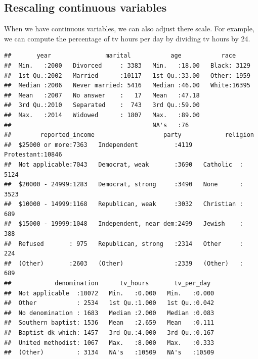 \documentclass[]{tufte-book}
\newenvironment{Shaded}{}{}
\newcommand{\DataTypeTok}[1]{\textcolor[rgb]{0.56,0.13,0.00}{#1}}
\newcommand{\DecValTok}[1]{\textcolor[rgb]{0.25,0.63,0.44}{#1}}
\newcommand{\KeywordTok}[1]{\textcolor[rgb]{0.00,0.44,0.13}{\textbf{#1}}}
\newcommand{\NormalTok}[1]{#1}
\newcommand{\OperatorTok}[1]{\textcolor[rgb]{0.40,0.40,0.40}{#1}}
\newcommand{\StringTok}[1]{\textcolor[rgb]{0.25,0.44,0.63}{#1}}
\begin{document}
\hypertarget{rescaling-continuous-variables}{%
\subsection{Rescaling continuous variables}\label{rescaling-continuous-variables}}

When we have continuous variables, we can also adjust there scale. For example, we can compute the percentage of tv hours per day by dividing tv hours by 24.

\begin{Shaded}
\end{Shaded}

\begin{verbatim}
##       year               marital           age           race      
##  Min.   :2000   Divorced     : 3383   Min.   :18.00   Black: 3129  
##  1st Qu.:2002   Married      :10117   1st Qu.:33.00   Other: 1959  
##  Median :2006   Never married: 5416   Median :46.00   White:16395  
##  Mean   :2007   No answer    :   17   Mean   :47.18                
##  3rd Qu.:2010   Separated    :  743   3rd Qu.:59.00                
##  Max.   :2014   Widowed      : 1807   Max.   :89.00                
##                                       NA's   :76                   
##        reported_income                   party            religion    
##  $25000 or more:7363   Independent          :4119   Protestant:10846  
##  Not applicable:7043   Democrat, weak       :3690   Catholic  : 5124  
##  $20000 - 24999:1283   Democrat, strong     :3490   None      : 3523  
##  $10000 - 14999:1168   Republican, weak     :3032   Christian :  689  
##  $15000 - 19999:1048   Independent, near dem:2499   Jewish    :  388  
##  Refused       : 975   Republican, strong   :2314   Other     :  224  
##  (Other)       :2603   (Other)              :2339   (Other)   :  689  
##            denomination      tv_hours       tv_per_day   
##  Not applicable  :10072   Min.   :0.000   Min.   :0.000  
##  Other           : 2534   1st Qu.:1.000   1st Qu.:0.042  
##  No denomination : 1683   Median :2.000   Median :0.083  
##  Southern baptist: 1536   Mean   :2.659   Mean   :0.111  
##  Baptist-dk which: 1457   3rd Qu.:4.000   3rd Qu.:0.167  
##  United methodist: 1067   Max.   :8.000   Max.   :0.333  
##  (Other)         : 3134   NA's   :10509   NA's   :10509
\end{verbatim}
\end{document}
